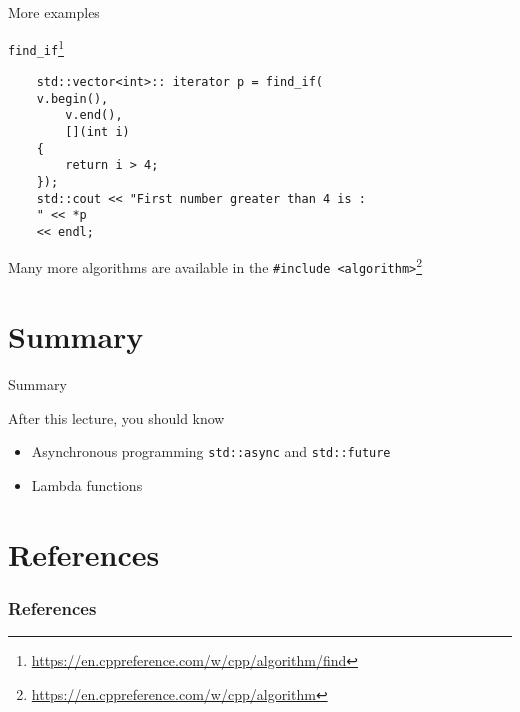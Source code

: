 \documentclass[12pt,t]{beamer}
\begin{document}
\begin{frame}[fragile]{More examples}

\begin{block}{\lstinline|find_if|\footnote{\tiny\url{https://en.cppreference.com/w/cpp/algorithm/find}}}
\begin{lstlisting}
    std::vector<int>:: iterator p = find_if(
    v.begin(), 
    	v.end(), 
    	[](int i) 
    { 
        return i > 4; 
    }); 
    std::cout << "First number greater than 4 is : 
    " << *p 
    << endl;
\end{lstlisting}
\end{block}
Many more algorithms are available in the \lstinline|#include <algorithm>|\footnote{\tiny\url{https://en.cppreference.com/w/cpp/algorithm}}
\end{frame}
     


\section{Summary}
\begin{frame}{Summary}
\begin{block}{After this lecture, you should know}
\begin{itemize}
\item Asynchronous programming \lstinline|std::async| and \lstinline|std::future|
\item Lambda functions
\end{itemize}
\end{block}
\end{frame}


\section{References}

\begin{frame}[t, allowframebreaks]
\frametitle{References}


\end{frame}
\end{document}
